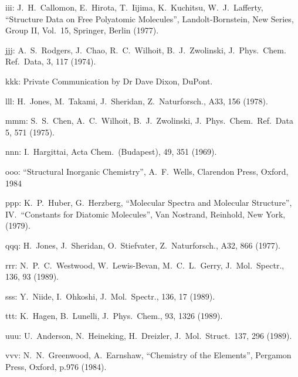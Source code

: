 \begin{description}
\item{ iii: } J.\ H.\ Callomon, E.\ Hirota, T.\ Iijima, K.\ Kuchitsu, W.\ J.\ Lafferty,
       ``Structure Data on Free Polyatomic Molecules'', Landolt-Bornstein,
       New Series, Group II, Vol.\ 15, Springer, Berlin (1977).
  
\item{ jjj: } A.\ S.\ Rodgers, J.\ Chao, R.\ C.\ Wilhoit, B.\ J.\ Zwolinski, J.\ Phys.\ Chem.
       Ref.\ Data, 3, 117 (1974).
  
\item{ kkk: } Private Communication by Dr Dave Dixon, DuPont.
  
\item{ lll: } H.\ Jones, M.\ Takami, J.\ Sheridan, Z.\ Naturforsch., A33, 156 (1978).
  
\item{ mmm: } S.\ S.\ Chen, A.\ C.\ Wilhoit, B.\ J.\ Zwolinski, J.\ Phys.\ Chem.\ Ref.\ Data 5,
       571 (1975).
  
\item{ nnn: } I.\ Hargittai, Acta Chem.\ (Budapest), 49, 351 (1969).
  
\item{ ooo: } ``Structural Inorganic Chemistry'', A.\ F.\ Wells, Clarendon Press, Oxford, 1984
  
\item{ ppp: } K.\ P.\ Huber, G.\ Herzberg, ``Molecular Spectra and Molecular Structure'',
       IV.\ ``Constants for Diatomic Molecules'', Van Nostrand, Reinhold,
       New York, (1979).
  
\item{ qqq: } H.\ Jones, J.\ Sheridan, O.\ Stiefvater, Z.\ Naturforsch., A32, 866 (1977).
  
\item{ rrr: } N.\ P.\ C.\ Westwood, W.\ Lewis-Bevan, M.\ C.\ L.\ Gerry,
       J.\ Mol.\ Spectr., 136, 93 (1989).
  
\item{ sss: } Y.\ Niide, I.\ Ohkoshi, J.\ Mol.\ Spectr., 136, 17 (1989).
  
\item{ ttt: } K.\ Hagen, B.\ Lunelli, J.\ Phys.\ Chem., 93, 1326 (1989).
  
\item{ uuu: } U.\ Anderson, N.\ Heineking, H.\ Dreizler, J.\ Mol.\ Struct.\ 137, 296 (1989).
  
\item{ vvv: } N.\ N.\ Greenwood, A.\ Earnshaw, ``Chemistry of the Elements'', Pergamon Press,
       Oxford, p.976 (1984).
  

\end{description}
